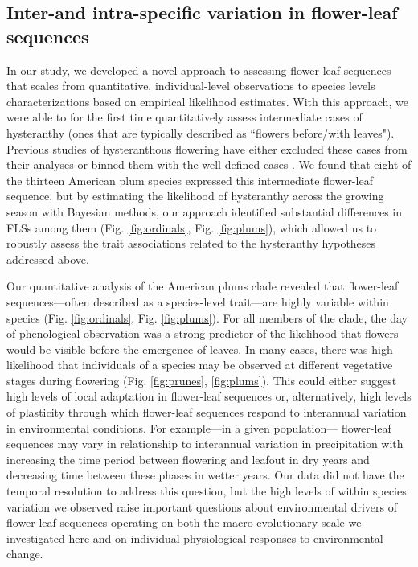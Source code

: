 \documentclass{article}[11pt]
\begin{document}
{\subsection*{Inter-and intra-specific variation in flower-leaf sequences}
In our study, we developed a novel approach to assessing flower-leaf sequences that scales from quantitative, individual-level observations to species levels characterizations based on empirical likelihood estimates. With this approach, we were able to for the first time quantitatively assess intermediate cases of hysteranthy (ones that are typically described as ``flowers before/with leaves"). Previous studies of hysteranthous flowering have either excluded these cases from their analyses  \citep[e.g.;][]{Gougherty2018} or binned them with the well defined cases \citep[e.g.;][]{Buonaiuto2020}. We found that eight of the thirteen American plum species expressed this intermediate flower-leaf sequence, but by estimating the likelihood of hysteranthy across the growing season with Bayesian methods, our approach identified substantial differences in FLSs among them (Fig. \ref{fig:ordinals}, Fig. \ref{fig:plums}), which allowed us to robustly assess the trait associations related to the hysteranthy hypotheses addressed above.

Our quantitative analysis of the American plums clade revealed that flower-leaf sequences---often described as a species-level trait---are highly variable within species (Fig. \ref{fig:ordinals}, Fig. \ref{fig:plums}). For all members of the clade, the day of phenological observation was a strong predictor of the likelihood that flowers would be visible before the emergence of leaves. In many cases, there was high likelihood that individuals of a species may be observed at different vegetative stages during flowering (Fig. \ref{fig:prunes}, \ref{fig:plums}). This could either suggest high levels of local adaptation in flower-leaf sequences or, alternatively, high levels of plasticity through which flower-leaf sequences respond to interannual variation in environmental conditions. For example---in a given population--- flower-leaf sequences may vary in relationship to interannual variation in precipitation with increasing the time period between flowering and leafout in dry years and decreasing time between these phases in wetter years. Our data did not have the temporal resolution to address this question, but the high levels of within species variation we observed raise important questions about environmental drivers of flower-leaf sequences operating on both the macro-evolutionary scale we investigated here and on individual physiological responses to environmental change. 

}
\end{document}
